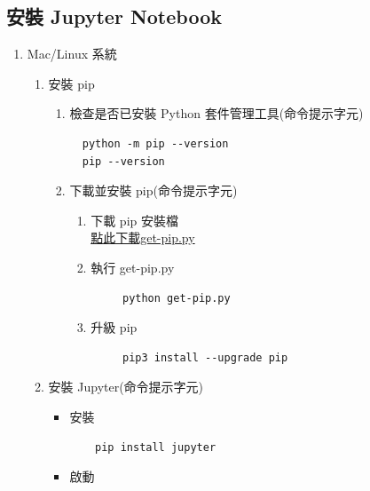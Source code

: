 \documentclass[a4paper,12pt]{article}
\begin{document}
\subsection{安裝 Jupyter Notebook}
\label{sec:org4d644f6}
\begin{enumerate}
\item Mac/Linux 系統
\label{sec:org841b853}
\begin{enumerate}
\item 安裝 pip
\label{sec:org42f5c03}
\begin{enumerate}
\item 檢查是否已安裝 Python 套件管理工具(命令提示字元)
\label{sec:org9cf19b2}
\lstset{breaklines=true,language=shell,label= ,caption= ,captionpos=b,numbers=none}
\begin{lstlisting}
  python -m pip --version
  pip --version
\end{lstlisting}
\item 下載並安裝 pip(命令提示字元)
\label{sec:org96da97f}
\begin{enumerate}
\item 下載 pip 安裝檔\\
\href{https://bootstrap.pypa.io/get-pip.py}{ 點此下載get-pip.py}\\
\item 執行 get-pip.py\\
\lstset{breaklines=true,language=shell,label= ,caption= ,captionpos=b,numbers=none}
\begin{lstlisting}
     python get-pip.py
\end{lstlisting}
\item 升級 pip\\
\lstset{breaklines=true,language=shell,label= ,caption= ,captionpos=b,numbers=none}
\begin{lstlisting}
     pip3 install --upgrade pip
\end{lstlisting}
\end{enumerate}
\end{enumerate}
\item 安裝 Jupyter(命令提示字元)
\label{sec:orgfef663f}
\begin{itemize}
\item 安裝\\
\lstset{breaklines=true,language=shell,label= ,caption= ,captionpos=b,numbers=none}
\begin{lstlisting}
    pip install jupyter
\end{lstlisting}
\item 啟動\\

\end{itemize}
\end{enumerate}
\end{enumerate}
\end{document}
